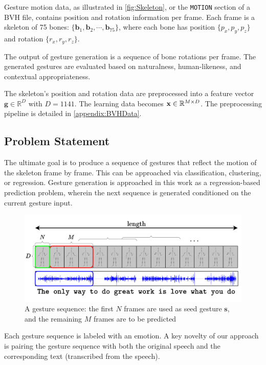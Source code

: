Gesture motion data, as illustrated in \autoref{fig:Skeleton}, or the \texttt{MOTION} section of a BVH file, contains position and rotation information per frame. Each frame is a skeleton of 75 bones: $\{ \mathbf{b}_{1}, \mathbf{b}_{2}, \cdots , \mathbf{b}_{75} \}$, where each bone has position $\{ p_{x}, p_{y}, p_{z} \}$ and rotation $\{ r_{x}, r_{y}, r_{z} \}$.

The output of gesture generation is a sequence of bone rotations per frame. The generated gestures are evaluated based on naturalness, human-likeness, and contextual appropriateness.

The skeleton's position and rotation data are preprocessed into a feature vector $\mathbf{g} \in \mathbb{R}^{D}$ with $D = 1141$. The learning data becomes $\mathbf{x} \in \mathbb{R}^{M \times D}$. The preprocessing pipeline is detailed in \autoref{appendix:BVHData}.

\subsection{Problem Statement}
\label{sec:ProblemStatement}

The ultimate goal is to produce a sequence of gestures that reflect the motion of the skeleton frame by frame. This can be approached via classification, clustering, or regression. Gesture generation is approached in this work as a regression-based prediction problem, wherein the next sequence is generated conditioned on the current gesture input.

\begin{figure}[h]
	\centering
 	\includegraphics[width=\linewidth]{figures/FeatureProcessing}
	\caption{A gesture sequence: the first $N$ frames are used as seed gesture $\mathbf{s}$, and the remaining $M$ frames are to be predicted}
	\label{fig:GestureSeries}
\end{figure}

Each gesture sequence is labeled with an emotion. A key novelty of our approach is pairing the gesture sequence with both the original speech and the corresponding text (transcribed from the speech).

